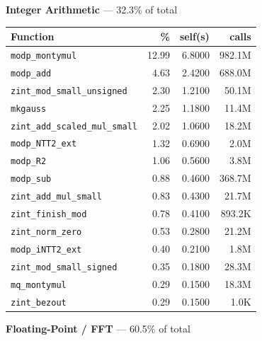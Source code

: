 \documentclass[11pt,a4paper]{article}
\begin{document}
\noindent\colorbox{intcolor}{\strut \textbf{Integer Arithmetic} --- 32.3\% of total}
\vspace{2pt}

\begin{longtable}{p{7.5cm}rrr}
\toprule
Function & \% & self(s) & calls \\
\midrule
\endhead
  \texttt{modp\_montymul} & 12.99 & 6.8000 & 982.1M \\
  \texttt{modp\_add} & 4.63 & 2.4200 & 688.0M \\
  \texttt{zint\_mod\_small\_unsigned} & 2.30 & 1.2100 & 50.1M \\
  \texttt{mkgauss} & 2.25 & 1.1800 & 11.4M \\
  \texttt{zint\_add\_scaled\_mul\_small} & 2.02 & 1.0600 & 18.2M \\
  \texttt{modp\_NTT2\_ext} & 1.32 & 0.6900 & 2.0M \\
  \texttt{modp\_R2} & 1.06 & 0.5600 & 3.8M \\
  \texttt{modp\_sub} & 0.88 & 0.4600 & 368.7M \\
  \texttt{zint\_add\_mul\_small} & 0.83 & 0.4300 & 21.7M \\
  \texttt{zint\_finish\_mod} & 0.78 & 0.4100 & 893.2K \\
  \texttt{zint\_norm\_zero} & 0.53 & 0.2800 & 21.2M \\
  \texttt{modp\_iNTT2\_ext} & 0.40 & 0.2100 & 1.8M \\
  \texttt{zint\_mod\_small\_signed} & 0.35 & 0.1800 & 28.3M \\
  \texttt{mq\_montymul} & 0.29 & 0.1500 & 18.3M \\
  \texttt{zint\_bezout} & 0.29 & 0.1500 & 1.0K \\
\bottomrule
\end{longtable}

\noindent\colorbox{fpcolor}{\strut \textbf{Floating-Point / FFT} --- 60.5\% of total}
\vspace{2pt}
\end{document}

